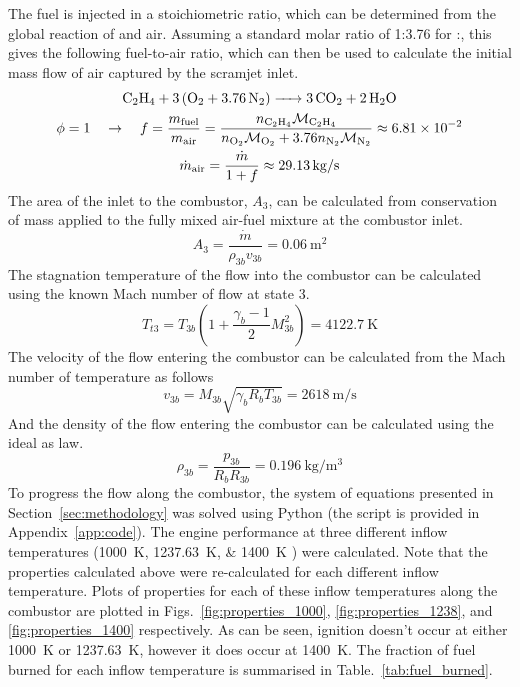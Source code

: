\documentclass[a4paper]{article}
\begin{document}
The fuel is injected in a stoichiometric ratio, which can be determined from the global reaction of  and air. Assuming a standard molar ratio of 1:3.76 for :, this gives the following fuel-to-air ratio, which can then be used to calculate the initial mass flow of air captured by the scramjet inlet.  
\begin{gather}
    \ce{C2H4 + 3(O2 + 3.76N2) -> 3CO2 + 2H2O} \\
    \phi = 1 \quad \rightarrow 
    \quad f = \frac{m_\text{fuel}}{m_\text{air}} 
    = \frac{
        n_{\ce{C2H4}} \mathcal{M}_{\ce{C2H4}}
    }{
        n_{\ce{O2}} \mathcal{M}_{\ce{O2}} + 3.76 n_{\ce{N2}} \mathcal{M}_{\ce{N2}}
    }
    \approx \num{6.81e-2} \\
    \dot{m}_\text{air} = \frac{\dot{m}}{1 + f} \approx \SI{29.13}{\kg\per\s}
\end{gather}
The area of the inlet to the combustor, \(A_3\), can be calculated from conservation of mass applied to the fully mixed air-fuel mixture at the combustor inlet.
\begin{equation}
    A_3 = \frac{\dot{m}}{\rho_{3b} v_{3b}} = \SI{0.06}{\m\squared}
\end{equation}
The stagnation temperature of the flow into the combustor can be calculated using the known Mach number of flow at state 3.
\begin{equation}
    T_{t3} = T_{3b} \left(1 +\frac{\gamma_b - 1 }{2}M_{3b}^2\right) = \SI{4122.7}{\K}
\end{equation}
The velocity of the flow entering the combustor can be calculated from the Mach number of temperature as follows
\begin{equation}
    v_{3b} = M_{3b} \sqrt{\gamma_b R_b T_{3b}} = \SI{2618}{\m\per\s}
\end{equation}
And the density of the flow entering the combustor can be calculated using the ideal as law.
\begin{equation}
    \rho_{3b} = \frac{p_{3b}}{R_b R_{3b}} = \SI{0.196}{\kg\per\m\cubed}
\end{equation}
To progress the flow along the combustor, the system of equations presented in Section~\ref{sec:methodology} was solved using Python (the script is provided in Appendix~\ref{app:code}). The engine performance at three different inflow temperatures (\SIlist{1000;1237.63;1400}{\K} ) were calculated. Note that the properties calculated above were re-calculated for each different inflow temperature. Plots of properties for each of these inflow temperatures along the combustor are plotted in Figs.~\ref{fig:properties_1000}, \ref{fig:properties_1238}, and \ref{fig:properties_1400} respectively. As can be seen, ignition doesn't occur at either \SI{1000}{\K} or \SI{1237.63}{\K}, however it does occur at \SI{1400}{\K}. The fraction of fuel burned for each inflow temperature is summarised in Table.~\ref{tab:fuel_burned}.
\end{document}
